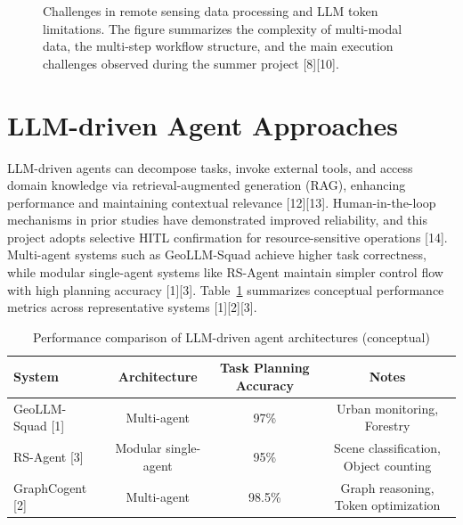 {\begin{figure}[H]
		\caption{Challenges in remote sensing data processing and LLM token limitations. The figure summarizes the complexity of multi-modal data, the multi-step workflow structure, and the main execution challenges observed during the summer project [8][10].}
		\label{fig:data-challenges}
	\end{figure}
	
	\section{LLM-driven Agent Approaches}
	LLM-driven agents can decompose tasks, invoke external tools, and access domain knowledge via retrieval-augmented generation (RAG), enhancing performance and maintaining contextual relevance [12][13]. Human-in-the-loop mechanisms in prior studies have demonstrated improved reliability, and this project adopts selective HITL confirmation for resource-sensitive operations [14]. Multi-agent systems such as GeoLLM-Squad achieve higher task correctness, while modular single-agent systems like RS-Agent maintain simpler control flow with high planning accuracy [1][3]. Table~\ref{tab:agent-performance} summarizes conceptual performance metrics across representative systems [1][2][3].
	
	\begin{table}[h!]
		\centering
		\footnotesize
		\caption{Performance comparison of LLM-driven agent architectures (conceptual)}
		\label{tab:agent-performance}
		\begin{tabular}{lccc}
			\hline
			System & Architecture & Task Planning Accuracy & Notes \\
			\hline
			GeoLLM-Squad [1] & Multi-agent & 97\% & Urban monitoring, Forestry \\
			RS-Agent [3] & Modular single-agent & 95\% & Scene classification, Object counting \\
			GraphCogent [2] & Multi-agent & 98.5\% & Graph reasoning, Token optimization \\
			\hline
		\end{tabular}
	\end{table}
	
}
